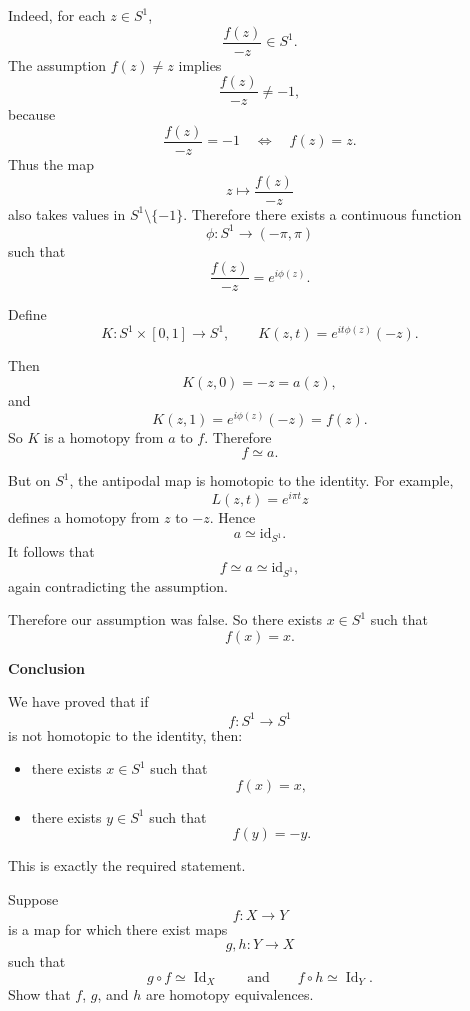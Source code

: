 \begin{solution}
Indeed, for each \(z\in S^1\),
\[
\frac{f(z)}{-z}\in S^1.
\]
The assumption \(f(z)\neq z\) implies
\[
\frac{f(z)}{-z}\neq -1,
\]
because
\[
\frac{f(z)}{-z}=-1
\quad\Longleftrightarrow\quad
f(z)=z.
\]
Thus the map
\[
z\longmapsto \frac{f(z)}{-z}
\]
also takes values in \(S^1\setminus\{-1\}\). Therefore there exists a continuous function
\[
\phi:S^1\to (-\pi,\pi)
\]
such that
\[
\frac{f(z)}{-z}=e^{i\phi(z)}.
\]

Define
\[
K:S^1\times[0,1]\to S^1,
\qquad
K(z,t)=e^{it\phi(z)}(-z).
\]

Then
\[
K(z,0)=-z=a(z),
\]
and
\[
K(z,1)=e^{i\phi(z)}(-z)=f(z).
\]
So \(K\) is a homotopy from \(a\) to \(f\). Therefore
\[
f\simeq a.
\]

But on \(S^1\), the antipodal map is homotopic to the identity. For example,
\[
L(z,t)=e^{i\pi t}z
\]
defines a homotopy from \(z\) to \(-z\). Hence
\[
a\simeq \mathrm{id}_{S^1}.
\]
It follows that
\[
f\simeq a\simeq \mathrm{id}_{S^1},
\]
again contradicting the assumption.

Therefore our assumption was false. So there exists \(x\in S^1\) such that
\[
f(x)=x.
\]


\medskip
\noindent\textbf{Conclusion}\par
\smallskip


We have proved that if
\[
f:S^1\to S^1
\]
is not homotopic to the identity, then:

\begin{itemize}
	\item there exists \(x\in S^1\) such that
	\[
	f(x)=x,
	\]
	\item there exists \(y\in S^1\) such that
	\[
	f(y)=-y.
	\]
\end{itemize}

This is exactly the required statement.
\end{solution}

\begin{problem}
Suppose
\[
f:X\to Y
\]
is a map for which there exist maps
\[
g,h:Y\to X
\]
such that
\[
g\circ f \simeq \operatorname{Id}_X
\qquad\text{and}\qquad
f\circ h \simeq \operatorname{Id}_Y.
\]
Show that \(f\), \(g\), and \(h\) are homotopy equivalences.
\end{problem}

